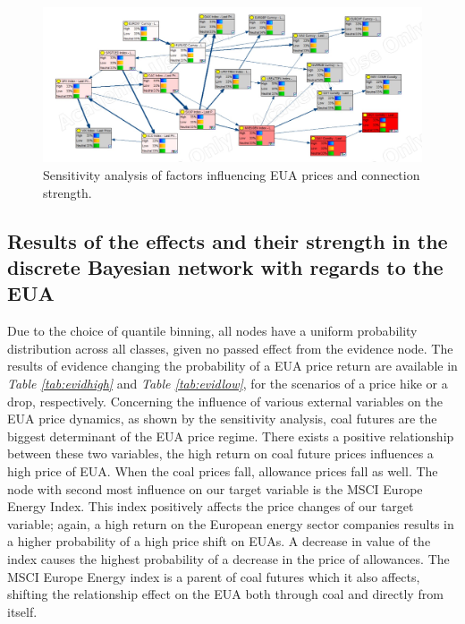 \documentclass[12pt, letterpaper]{article}
\begin{document}
\begin{figure}[ht]
\centering
\includegraphics[width=1\textwidth]{graphics/StrengthAnalysis.jpeg}
\caption{Sensitivity analysis of factors influencing EUA prices and connection strength.}
\label{fig:sensitivity}
\end{figure}

\subsection{Results of the effects and their strength in the discrete Bayesian network with regards to the EUA}

Due to the choice of quantile binning, all nodes have a uniform probability distribution across all classes, given no passed effect from the evidence node. The results of evidence changing the probability of a EUA price return are available in \textit{Table \ref{tab:evidhigh}} and \textit{Table \ref{tab:evidlow}}, for the scenarios of a price hike or a drop, respectively. Concerning the influence of various external variables on the EUA price dynamics, as shown by the sensitivity analysis, coal futures are the biggest determinant of the EUA price regime. There exists a positive relationship between these two variables, the high return on coal future prices influences a high price of EUA. When the coal prices fall, allowance prices fall as well. The node with second most influence on our target variable is the MSCI Europe Energy Index. This index positively affects the price changes of our target variable; again, a high return on the European energy sector companies results in a higher probability of a high price shift on EUAs. A decrease in value of the index causes the highest probability of a decrease in the price of allowances. The MSCI Europe Energy index is a parent of coal futures which it also affects, shifting the relationship effect on the EUA both through coal and directly from itself.
\end{document}
